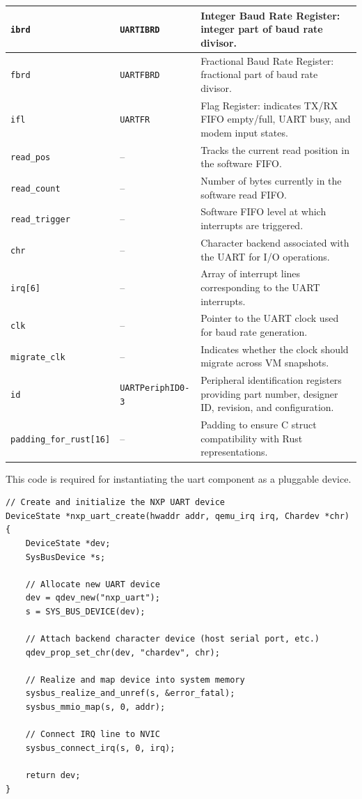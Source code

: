 \documentclass{article}
\begin{document}
\begin{table}[h!]
\begin{tabular}{|l|l|p{8cm}|}
\hline
\texttt{ibrd} & \texttt{UARTIBRD} & Integer Baud Rate Register: integer part of baud rate divisor. \\
\hline
\texttt{fbrd} & \texttt{UARTFBRD} & Fractional Baud Rate Register: fractional part of baud rate divisor. \\
\hline
\texttt{ifl} & \texttt{UARTFR} & Flag Register: indicates TX/RX FIFO empty/full, UART busy, and modem input states. \\
\hline
\texttt{read\_pos} & -- & Tracks the current read position in the software FIFO. \\
\hline
\texttt{read\_count} & -- & Number of bytes currently in the software read FIFO. \\
\hline
\texttt{read\_trigger} & -- & Software FIFO level at which interrupts are triggered. \\
\hline
\texttt{chr} & -- & Character backend associated with the UART for I/O operations. \\
\hline
\texttt{irq[6]} & -- & Array of interrupt lines corresponding to the UART interrupts. \\
\hline
\texttt{clk} & -- & Pointer to the UART clock used for baud rate generation. \\
\hline
\texttt{migrate\_clk} & -- & Indicates whether the clock should migrate across VM snapshots. \\
\hline
\texttt{id} & \texttt{UARTPeriphID0-3} & Peripheral identification registers providing part number, designer ID, revision, and configuration. \\
\hline
\texttt{padding\_for\_rust[16]} & -- & Padding to ensure C struct compatibility with Rust representations. \\
\hline
\end{tabular}
\end{table}




\newpage
This code is required for instantiating the uart component as a pluggable device.

\begin{verbatim}
// Create and initialize the NXP UART device
DeviceState *nxp_uart_create(hwaddr addr, qemu_irq irq, Chardev *chr)
{
    DeviceState *dev;
    SysBusDevice *s;

    // Allocate new UART device
    dev = qdev_new("nxp_uart");
    s = SYS_BUS_DEVICE(dev);

    // Attach backend character device (host serial port, etc.)
    qdev_prop_set_chr(dev, "chardev", chr);

    // Realize and map device into system memory
    sysbus_realize_and_unref(s, &error_fatal);
    sysbus_mmio_map(s, 0, addr);

    // Connect IRQ line to NVIC
    sysbus_connect_irq(s, 0, irq);

    return dev;
}
\end{verbatim}
\end{document}

